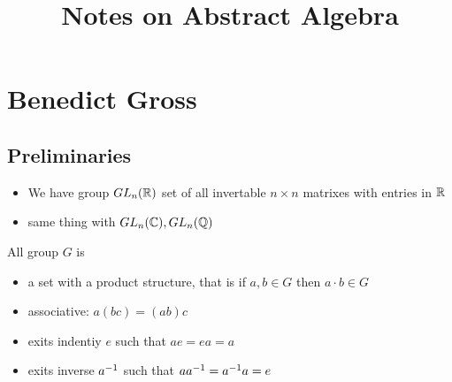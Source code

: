 



\title{Notes on Abstract Algebra}


\chapter{Benedict Gross}
\maketitle

\section{Preliminaries}
\begin{itemize}
  \item We have group
    $GL_n(\mathbb{R})$ set of all invertable $n\times n$ matrixes with
    entries in $\mathbb{R}$
  \item same thing with $GL_n(\mathbb{C}), GL_n(\mathbb{Q})$
\end{itemize}
\begin{definition}[Group]
  All group $G$ is 
  \begin{itemize}
    \item  a set with a product structure, that is if 
      $a,b\in G$ then $a\cdot b\in G$
    \item associative: $a(bc)=(ab)c$
    \item exits indentiy $e$ such that $ae=ea=a$
    \item exits inverse $a^{-1}$  such that
      $aa^{-1}=a^{-1} a=e$
  \end{itemize}
\end{definition}

